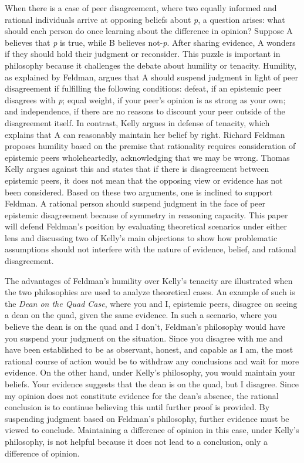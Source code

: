 \documentclass[12pt, a4paper, twoside]{article}
\begin{document}
\maketitle{}

When there is a case of peer disagreement, where two equally informed and rational individuals arrive at opposing beliefs about \emph{p}, a question arises: what should each person do once learning about the difference in opinion? Suppose A believes that \emph{p} is true, while B believes not-\emph{p}. After sharing evidence, A wonders if they should hold their judgment or reconsider. This puzzle is important in philosophy because it challenges the debate about humility or tenacity. Humility, as explained by Feldman, argues that A should suspend judgment in light of peer disagreement if fulfilling the following conditions: defeat, if an epistemic peer disagrees with \emph{p}; equal weight, if your peer’s opinion is as strong as your own; and independence, if there are no reasons to discount your peer outside of the disagreement itself. In contrast, Kelly argues in defense of tenacity, which explains that A can reasonably maintain her belief by right. Richard Feldman proposes humility based on the premise that rationality requires consideration of epistemic peers wholeheartedly, acknowledging that we may be wrong. Thomas Kelly argues against this and states that if there is disagreement between epistemic peers, it does not mean that the opposing view or evidence has not been considered. Based on these two arguments, one is inclined to support Feldman. A rational person should suspend judgment in the face of peer epistemic disagreement because of symmetry in reasoning capacity. This paper will defend Feldman’s position by evaluating theoretical scenarios under either lens and discussing two of Kelly’s main objections to show how problematic assumptions should not interfere with the nature of evidence, belief, and rational disagreement. 

The advantages of Feldman’s humility over Kelly’s tenacity are illustrated when the two philosophies are used to analyze theoretical cases. An example of such is the \emph{Dean on the Quad Case}, where you and I, epistemic peers, disagree on seeing a dean on the quad, given the same evidence. In such a scenario, where you believe the dean is on the quad and I don’t, Feldman’s philosophy would have you suspend your judgment on the situation. Since you disagree with me and have been established to be as observant, honest, and capable as I am, the most rational course of action would be to withdraw any conclusions and wait for more evidence. On the other hand, under Kelly’s philosophy, you would maintain your beliefs. Your evidence suggests that the dean is on the quad, but I disagree. Since my opinion does not constitute evidence for the dean’s absence, the rational conclusion is to continue believing this until further proof is provided. By suspending judgment based on Feldman’s philosophy, further evidence must be viewed to conclude. Maintaining a difference of opinion in this case, under Kelly’s philosophy, is not helpful because it does not lead to a conclusion, only a difference of opinion. 
\end{document}

